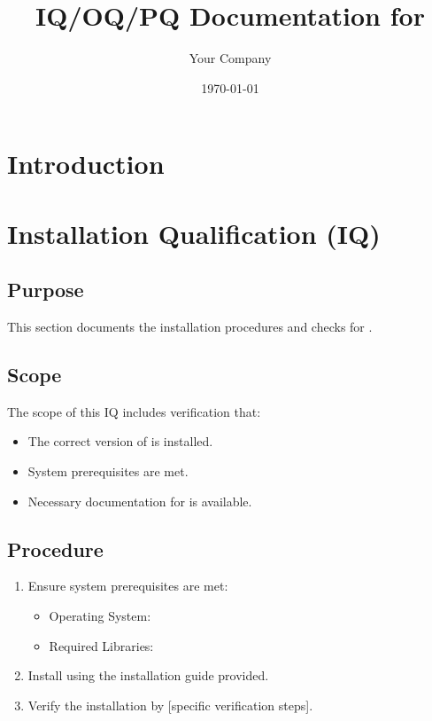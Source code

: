 \documentclass[12pt]{article}
\begin{document}
\title{IQ/OQ/PQ Documentation for \softwareName}
\author{Your Company}
\date{\today}

\maketitle

\section*{Introduction}
\softwareDescription

\tableofcontents

\section{Installation Qualification (IQ)}
\subsection{Purpose}
This section documents the installation procedures and checks for \softwareName.

\subsection{Scope}
The scope of this IQ includes verification that:

\begin{itemize}
    \item The correct version of \softwareName is installed.
    \item System prerequisites are met.
    \item Necessary documentation for \softwareName is available.
\end{itemize}

\subsection{Procedure}
\begin{enumerate}
    \item Ensure system prerequisites are met:
    \begin{itemize}
        \item Operating System: \softwareOS
        \item Required Libraries: \softwareLibs
    \end{itemize}
    \item Install \softwareName using the installation guide provided.
    \item Verify the installation by [specific verification steps].
\end{enumerate}
\end{document}
